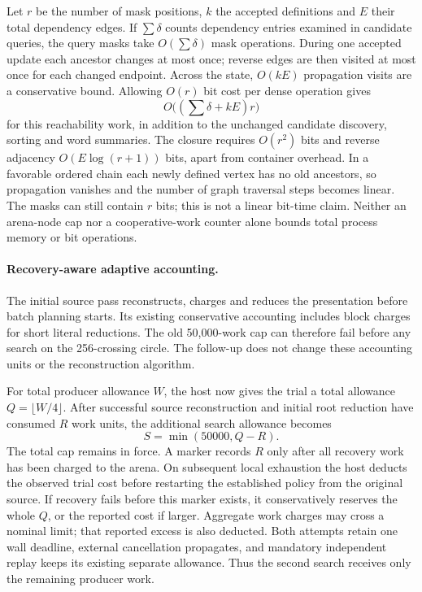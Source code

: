Let $r$ be the number of mask positions, $k$ the accepted definitions and
$E$ their total dependency edges. If $\sum\delta$ counts dependency entries
examined in candidate queries, the query masks take $O(\sum\delta)$ mask
operations. During one accepted update each ancestor changes at most once;
reverse edges are then visited at most once for each changed endpoint.
Across the state, $O(kE)$ propagation visits are a conservative bound.
Allowing $O(r)$ bit cost per dense operation gives
\[
 O\bigl((\sum\delta+kE)r\bigr)
\]
for this reachability work, in addition to the unchanged candidate discovery,
sorting and word summaries. The closure requires $O(r^2)$ bits and reverse
adjacency $O(E\log(r+1))$ bits, apart from container overhead. In a favorable
ordered chain each newly defined vertex has no old ancestors, so propagation
vanishes and the number of graph traversal steps becomes linear. The masks
can still contain $r$ bits; this is not a linear bit-time claim. Neither an
arena-node cap nor a cooperative-work counter alone bounds total process
memory or bit operations.

\paragraph{Recovery-aware adaptive accounting.}
The initial source pass reconstructs, charges and reduces the presentation
before batch planning starts. Its existing conservative accounting includes
block charges for short literal reductions. The old 50,000-work cap can
therefore fail before any search on the 256-crossing circle. The follow-up
does not change these accounting units or the reconstruction algorithm.

For total producer allowance $W$, the host now gives the trial a total
allowance $Q=\lfloor W/4\rfloor$. After successful source reconstruction and
initial root reduction have consumed $R$ work units, the additional search
allowance becomes
\[
 S=\min(50000,Q-R).
\]
The total cap remains in force. A marker records $R$ only after all recovery
work has been charged to the arena. On subsequent local exhaustion the host
deducts the observed trial cost before restarting the established policy
from the original source. If recovery fails before this marker exists,
it conservatively reserves the whole $Q$, or the reported cost if larger.
Aggregate work charges may cross a nominal limit; that reported excess is
also deducted. Both attempts retain one wall deadline, external cancellation
propagates, and mandatory independent replay keeps its existing separate
allowance. Thus the second search receives only the remaining producer work.

